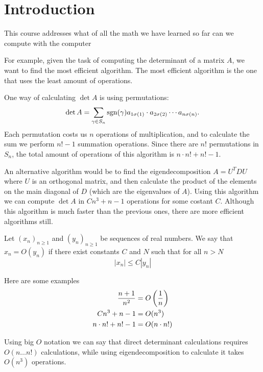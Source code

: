 \documentclass[11pt,a4paper]{article}
\begin{document}
\maketitle


\newpage
\tableofcontents
\newpage

\section{Introduction}
This course addresses what of all the math we have learned so far can
we compute with the computer

For example, given the task of computing the determinant of a matrix $A$,
we want to find the most efficient algorithm.
The most efficient algorithm is the one that uses the least amount of
operations.

One way of calculating $\det A$ is using permutations:
\[
  \det A = \sum_{\gamma \in S_n}
  \operatorname{sgn}(\gamma) a_{1 \sigma(1)} \cdot a_{2 \sigma(2)} \cdots a_{n \sigma(n)}.
\]
Each permutation costs us $n$ operations of multiplication, and to calculate
the sum we perform $n! - 1$ summation operations.
Since there are $n!$ permutations in $S_n$, the total amount of operations
of this algorithm is $n \cdot n! + n! - 1$.

An alternative algorithm would be to find the eigendecomposition
$A = U^{T} D U$ where $U$ is an orthogonal matrix, and then calculate
the product of the elements on the main diagonal of $D$ (which are the
eigenvalues of $A$).
Using this algorithm we can compute $\det A$ in $C n^3 + n - 1$ operations
for some costant $C$.
Although this algorithm is much faster than the previous ones, there are
more efficient algorithms still.

\begin{definition}
  Let $(x_n)_{n \geq 1}$ and $(y_n)_{n \geq 1}$ be sequences of real numbers.
  We say that $x_n = O(y_n)$ if there exist constants $C$ and $N$ such that
  for all $n > N$
  \[
    |x_n| \le C |y_n|
  \]
\end{definition}

Here are some examples
\begin{align*}
  \frac{n + 1}{n^2} &= O\del{\frac 1n} \\
  Cn^3 + n - 1 &= O(n^3) \\
  n \cdot n! + n! - 1 &= O(n \cdot n!)
\end{align*}

Using big $O$ notation we can say that direct determinant calculations
requires $O(n \dots n!)$ calculations, while using eigendecomposition
to calculate it takes $O(n^3)$ operations.
\end{document}
